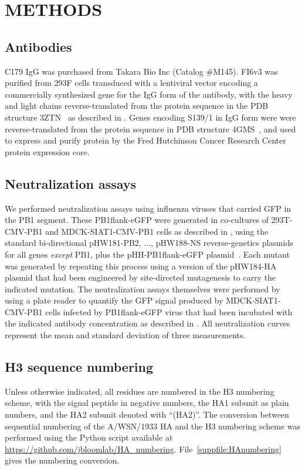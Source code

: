 \documentclass[11pt]{article}
\begin{document}
\clearpage
\small

\section*{METHODS}
\label{sec:methods}
\subsection*{Antibodies}
C179 IgG was purchased from Takara Bio Inc (Catalog \#M145).
FI6v3 was purified from 293F cells transduced with a lentiviral vector encoding a commercially synthesized gene for the IgG form of the antibody, with the heavy and light chains reverse-translated from the protein sequence in the PDB structure 3ZTN~\citep{corti2011neutralizing} as described in \citet{balazs2013broad}.
Genes encoding S139/1 in IgG form were were reverse-translated from the protein sequence in PDB structure 4GMS~\citep{lee2012heterosubtypic}, and used to express and purify protein by the Fred Hutchinson Cancer Research Center protein expression core.

\subsection*{Neutralization assays}
We performed neutralization assays using influenza viruses that carried GFP in the PB1 segment.
These PB1flank-eGFP were generated in co-cultures of 293T-CMV-PB1 and MDCK-SIAT1-CMV-PB1 cells as described in \citet{bloom2010permissive}, using the standard bi-directional pHW181-PB2, ..., pHW188-NS reverse-genetics plasmids~\citep{hoffmann2000dna} for all genes \emph{except} PB1, plus the pHH-PB1flank-eGFP plasmid~\citep{bloom2010permissive}.
Each mutant was generated by repeating this process using a version of the pHW184-HA plasmid that had been engineered by site-directed mutagenesis to carry the indicated mutation.
The neutralization assays themselves were performed by using a plate reader to quantify the GFP signal produced by MDCK-SIAT1-CMV-PB1 cells infected by PB1flank-eGFP virus that had been incubated with the indicated antibody concentration as described in \citet{hooper2013mutant}.
All neutralization curves represent the mean and standard deviation of three measurements. 
\subsection*{H3 sequence numbering}
Unless otherwise indicated, all residues are numbered in the H3 numbering scheme, with the signal peptide in negative numbers, the HA1 subunit as plain numbers, and the HA2 subunit denoted with ``(HA2)''. 
The conversion between sequential numbering of the A/WSN/1933 HA and the H3 numbering scheme was performed using the Python script available at \url{https://github.com/jbloomlab/HA_numbering}.
File~\ref{suppfile:HAnumbering} gives the numbering conversion.  
\end{document}
